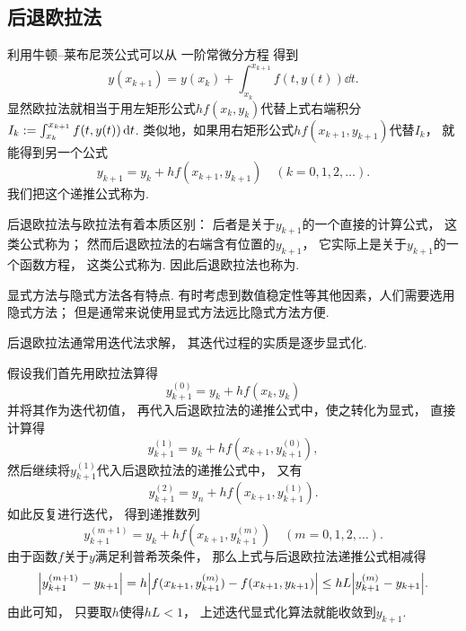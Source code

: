 \subsection{后退欧拉法}
利用牛顿--莱布尼茨公式可以从
一阶常微分方程 
得到\begin{equation}\label{equation:一阶常微分方程的初值问题.积分递推公式}
	y(x_{k+1})
	= y(x_k)
	+ \int_{x_k}^{x_{k+1}} f(t,y(t)) \dd{t}.
\end{equation}
显然欧拉法就相当于用左矩形公式\(h f(x_k,y_k)\)代替上式右端积分\(I_k := \int_{x_k}^{x_{k+1}} f(t,y(t)) \dd{t}\).
类似地，如果用右矩形公式\(h f(x_{k+1},y_{k+1})\)代替\(I_k\)，
就能得到另一个公式\begin{equation}
	y_{k+1}
	= y_k
	+ h f(x_{k+1},y_{k+1})
	\quad(k=0,1,2,\dotsc).
\end{equation}
我们把这个递推公式称为.

后退欧拉法与欧拉法有着本质区别：
后者是关于\(y_{k+1}\)的一个直接的计算公式，
这类公式称为；
然而后退欧拉法的右端含有位置的\(y_{k+1}\)，
它实际上是关于\(y_{k+1}\)的一个函数方程，
这类公式称为.
因此后退欧拉法也称为.


显式方法与隐式方法各有特点.
有时考虑到数值稳定性等其他因素，人们需要选用隐式方法；
但是通常来说使用显式方法远比隐式方法方便.


后退欧拉法通常用迭代法求解，
其迭代过程的实质是逐步显式化.

假设我们首先用欧拉法算得\begin{equation*}
	y_{k+1}^{(0)}
	= y_k
	+ h f(x_k,y_k)
\end{equation*}
并将其作为迭代初值，
再代入后退欧拉法的递推公式中，使之转化为显式，
直接计算得\begin{equation*}
	y_{k+1}^{(1)}
	= y_k
	+ h f(x_{k+1},y_{k+1}^{(0)}),
\end{equation*}
然后继续将\(y_{k+1}^{(1)}\)代入后退欧拉法的递推公式中，
又有\begin{equation*}
	y_{k+1}^{(2)}
	= y_n
	+ h f(x_{k+1},y_{k+1}^{(1)}).
\end{equation*}
如此反复进行迭代，
得到递推数列\begin{equation}
	y_{k+1}^{(m+1)}
	= y_k
	+ h f(x_{k+1},y_{k+1}^{(m)})
	\quad(m=0,1,2,\dotsc).
\end{equation}
由于函数\(f\)关于\(y\)满足利普希茨条件，
那么上式与后退欧拉法递推公式相减得\begin{equation*}
	\abs{
		y_{k+1}^{(m+1)}
		- y_{k+1}
	}
	= h \abs{
		f(x_{k+1},y_{k+1}^{(m)})
		- f(x_{k+1},y_{k+1})
	}
	\leq h L
	\abs{
		y_{k+1}^{(m)}
		- y_{k+1}
	}.
\end{equation*}
由此可知，
只要取\(h\)使得\(h L < 1\)，
上述迭代显式化算法就能收敛到\(y_{k+1}\).

